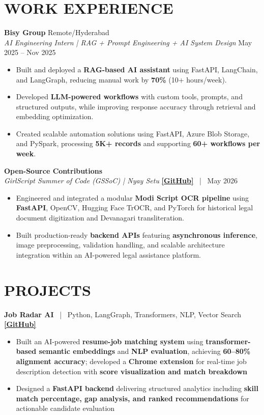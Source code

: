 \documentclass[a4paper,10pt]{article}
\begin{document}
\section*{WORK EXPERIENCE}

\textbf{Bisy Group} \hfill Remote/Hyderabad \\
\textit{AI Engineering Intern | RAG + Prompt Engineering + AI System Design} \hfill May 2025 -- Nov 2025
\begin{itemize}
\item Built and deployed a \textbf{RAG-based AI assistant} using FastAPI, LangChain, and LangGraph, reducing manual work by \textbf{70\%} (10+ hours/week).

\item Developed \textbf{LLM-powered workflows} with custom tools, prompts, and structured outputs, while improving response accuracy through retrieval and embedding optimization.

\item Created scalable automation solutions using FastAPI, Azure Blob Storage, and PySpark, processing \textbf{5K+ records} and supporting \textbf{60+ workflows per week}.
\end{itemize}
\textbf{Open-Source Contributions} \\
\textit{GirlScript Summer of Code (GSSoC) | Nyay Setu} \hfill \href{https://github.com/viru0909-dev/nyay-setu-working/pull/249#pullrequestreview-4287195395}{\textbf{[GitHub]}} \ | \ May 2026
\begin{itemize}
    \item Engineered and integrated a modular \textbf{Modi Script OCR pipeline} using \textbf{FastAPI}, OpenCV, Hugging Face TrOCR, and PyTorch for historical legal document digitization and Devanagari transliteration.
    \item Built production-ready \textbf{backend APIs} featuring \textbf{asynchronous inference}, image preprocessing, validation handling, and scalable architecture integration within an AI-powered legal assistance platform.
\end{itemize}

\section*{PROJECTS}
\textbf{Job Radar AI} \ | \ Python, LangGraph, Transformers, NLP, Vector Search \hfill \href{https://github.com/Chitranshu0/job-radar-ai}{\textbf{[GitHub]}}
\begin{itemize}
\item Built an AI-powered \textbf{resume-job matching system} using \textbf{transformer-based semantic embeddings} and \textbf{NLP evaluation}, achieving \textbf{60--80\% alignment accuracy}; developed a \textbf{Chrome extension} for real-time job description detection with \textbf{score visualization and match breakdown}
\item Designed a \textbf{FastAPI backend} delivering structured analytics including \textbf{skill match percentage, gap analysis, and ranked recommendations} for actionable candidate evaluation
\end{itemize}
\end{document}
